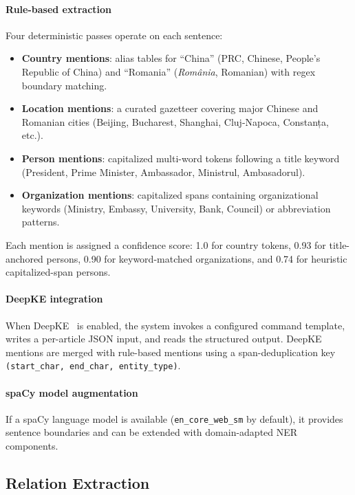 \documentclass[conference]{IEEEtran}
\begin{document}
\paragraph{Rule-based extraction}
Four deterministic passes operate on each sentence:
\begin{itemize}
  \item \textbf{Country mentions}: alias tables for ``China'' (PRC,
        Chinese, People's Republic of China) and ``Romania'' (\textit{România},
        Romanian) with regex boundary matching.
  \item \textbf{Location mentions}: a curated gazetteer covering major
        Chinese and Romanian cities (Beijing, Bucharest, Shanghai, Cluj-Napoca,
        Constanța, etc.).
  \item \textbf{Person mentions}: capitalized multi-word tokens following
        a title keyword (President, Prime Minister, Ambassador, Ministrul,
        Ambasadorul).
  \item \textbf{Organization mentions}: capitalized spans containing
        organizational keywords (Ministry, Embassy, University, Bank,
        Council) or abbreviation patterns.
\end{itemize}
Each mention is assigned a confidence score: 1.0 for country tokens,
0.93 for title-anchored persons, 0.90 for keyword-matched organizations,
and 0.74 for heuristic capitalized-span persons.

\paragraph{DeepKE integration}
When DeepKE~\cite{zhang2022deepke} is enabled, the system invokes a
configured command template, writes a per-article JSON input, and reads the
structured output. DeepKE mentions are merged with rule-based mentions using
a span-deduplication key \texttt{(start\_char, end\_char, entity\_type)}.

\paragraph{spaCy model augmentation}
If a spaCy language model is available (\texttt{en\_core\_web\_sm} by
default), it provides sentence boundaries and can be extended with
domain-adapted NER components.

\subsection{Relation Extraction}
\end{document}
